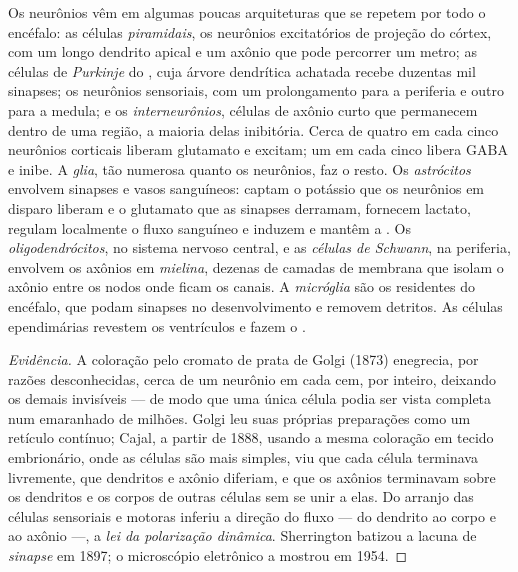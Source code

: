 \begin{definition}\label{def:b3:nervous-systems:cells}
Os neurônios vêm em algumas poucas arquiteturas que se repetem por todo
o encéfalo: as células \emph{piramidais}, os neurônios excitatórios de
projeção do córtex, com um longo dendrito apical e um axônio que pode
percorrer um metro; as células de \emph{Purkinje} do , cuja
árvore dendrítica achatada recebe duzentas mil sinapses; os neurônios
sensoriais, com um prolongamento para a periferia e outro para a
medula; e os \emph{interneurônios}, células de axônio curto que
permanecem dentro de uma região, a maioria delas inibitória. Cerca de
quatro em cada cinco neurônios corticais liberam glutamato e excitam;
um em cada cinco libera GABA e inibe. A \emph{glia}, tão numerosa
quanto os neurônios, faz o resto. Os \emph{astrócitos} envolvem sinapses
e vasos sanguíneos: captam o potássio que os neurônios em disparo
liberam e o glutamato que as sinapses derramam, fornecem lactato,
regulam localmente o fluxo sanguíneo e induzem e mantêm a . Os \emph{oligodendrócitos}, no sistema nervoso
central, e as \emph{células de Schwann}, na periferia, envolvem os
axônios em \emph{mielina}, dezenas de camadas de membrana que isolam o
axônio entre os nodos onde ficam os canais. A \emph{micróglia} são os
 residentes do encéfalo, que podam sinapses no
desenvolvimento e removem detritos. As células ependimárias revestem os
ventrículos e fazem o .
\end{definition}

\begin{proof}[Evidência]
A coloração pelo cromato de prata de Golgi (1873) enegrecia, por razões
desconhecidas, cerca de um neurônio em cada cem, por inteiro, deixando
os demais invisíveis --- de modo que uma única célula podia ser vista
completa num emaranhado de milhões. Golgi leu suas próprias preparações
como um retículo contínuo; Cajal, a partir de 1888, usando a mesma
coloração em tecido embrionário, onde as células são mais simples, viu
que cada célula terminava livremente, que dendritos e axônio diferiam, e
que os axônios terminavam sobre os dendritos e os corpos de outras
células sem se unir a elas. Do arranjo das células sensoriais e motoras
inferiu a direção do fluxo --- do dendrito ao corpo e ao axônio ---, a
\emph{lei da polarização dinâmica}. Sherrington batizou a lacuna de
\emph{sinapse} em 1897; o microscópio eletrônico a mostrou em 1954.
\end{proof}

